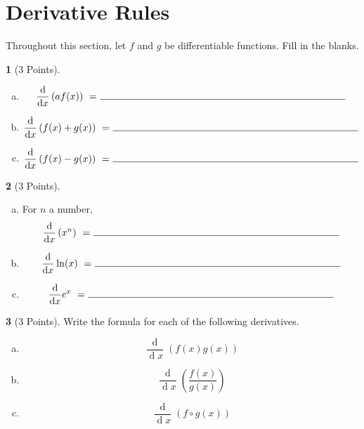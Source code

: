 \documentclass[12pt]{amsart}
\theoremstyle{definition}
\newtheorem{thm}{}
\theoremstyle{definition}
\newcommand{\ddx}[1]{\frac{\operatorname{d}}{\operatorname{d}\!#1}}
\begin{document}
\section{Derivative Rules}
Throughout this section, let $f$ and $g$ be differentiable functions.
Fill in the blanks.
\begin{thm}[3 Points]
  \begin{enumerate}[(a)]
    Let $a$ be a constant.
  \item
    \vspace{.05in}
    $$\ddx{x}\left(a f(x)\right)\ =\ \line(1,0){250}$$
    \vspace{.05in}
  \item
    \vspace{.05in}
    $$\ddx{x}\left(f(x) + g(x)\right)\ =\ \line(1,0){250}$$ 
    \vspace{.05in}
  \item
    \vspace{.05in}
    $$\ddx{x}\left(f(x) - g(x)\right)\ =\ \line(1,0){250}$$ 
  \end{enumerate}
\end{thm}

\vspace{.5in}

\begin{thm}[3 Points]
  \begin{enumerate}[(a)]
  \item
    For $n$ a number,
    \vspace{.05in}
    $$\ddx{x}\left(x^n\right)\ =\ \line(1,0){250}$$
    \vspace{.05in}
  \item
    \vspace{.05in}
    $$\ddx{x}\ln(x)\ =\ \line(1,0){250}$$
    \vspace{.05in}
  \item
    \vspace{.05in}
    $$\ddx{x}e^x\ =\ \line(1,0){250}$$
    \vspace{.05in}
  \end{enumerate}
\end{thm}

\newpage

\begin{thm}[3 Points]
  Write the formula for each of the following derivatives.
  \vspace{.05in}
  \begin{enumerate}[(a)]
  \item
    $$\ddx{x}\left(f(x)g(x)\right)$$
    \vspace{2in}
  \item
    $$\ddx{x}\left(\frac{f(x)}{g(x)}\right)$$
    \vspace{2in}
  \item
    $$\ddx{x}\left(f \circ g(x)\right)$$    
  \end{enumerate}
\end{thm}
\end{document}
